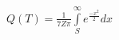 \documentclass[20pt]{report}
\begin{document}
\begin{center}
\(
Q(T)=\frac{1}{7Z\pi }\int\limits_{S}^{\infty }e^{\frac{-x^{2}}{2}}d x
\)
\end{center}
\end{document}
